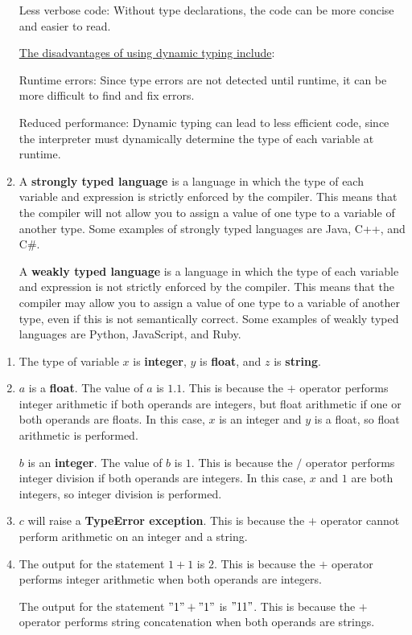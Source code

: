 \documentclass[letterpaper,11pt]{article}
\newcounter{problemid}
\def\newproblem{\clearpage\newpage{\bf Problem~\arabic{problemid}\stepcounter{problemid}}\hfill\par}
\begin{document}
\begin{enumerate}
    Less verbose code: Without type declarations, the code can be more concise and easier to read.
    
    \underline{The disadvantages of using dynamic typing include}:

    Runtime errors: Since type errors are not detected until runtime, it can be more difficult to find and fix errors.
    
    Reduced performance: Dynamic typing can lead to less efficient code, since the interpreter must dynamically determine the type of each variable at runtime.
    
    \item A \textbf{strongly typed language} is a language in which the type of each variable and expression is strictly enforced by the compiler. This means that the compiler will not allow you to assign a value of one type to a variable of another type. Some examples of strongly typed languages are Java, C++, and C\#.

    A \textbf{weakly typed language} is a language in which the type of each variable and expression is not strictly enforced by the compiler. This means that the compiler may allow you to assign a value of one type to a variable of another type, even if this is not semantically correct. Some examples of weakly typed languages are Python, JavaScript, and Ruby.

\end{enumerate}


\newproblem
\begin{enumerate}

    \item The type of variable $x$ is \textbf{integer}, $y$ is \textbf{float}, and $z$ is \textbf{string}.
    
    \item $a$ is a \textbf{float}. The value of $a$ is $1.1$. This is because the $+$ operator performs integer arithmetic if both operands are integers, but float arithmetic if one or both operands are floats. In this case, $x$ is an integer and $y$ is a float, so float arithmetic is performed.
    
    $b$ is an \textbf{integer}. The value of $b$ is $1$. This is because the $/$ operator performs integer division if both operands are integers. In this case, $x$ and $1$ are both integers, so integer division is performed.
    
    \item $c$ will raise a \textbf{TypeError exception}. This is because the $+$ operator cannot perform arithmetic on an integer and a string.
    
    \item The output for the statement $1+1$ is $2$. This is because the $+$ operator performs integer arithmetic when both operands are integers.
    
    The output for the statement $"1"+"1"$ is $"11"$. This is because the $+$ operator performs string concatenation when both operands are strings.

\end{enumerate}
\end{document}
